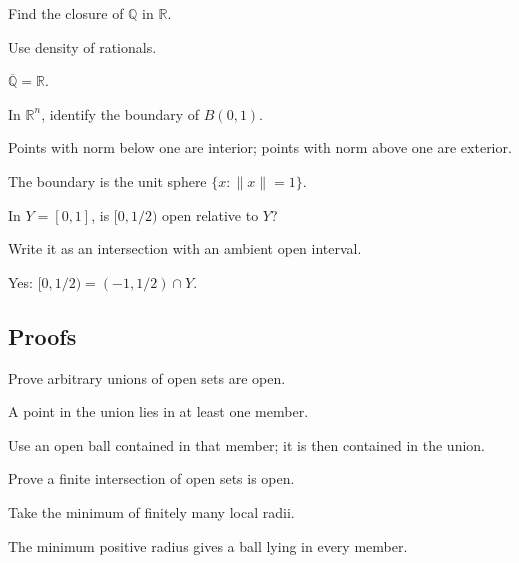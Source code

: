 \begin{exercise}\label{exr:ii04-expand-03}
Find the closure of \(\mathbb Q\) in \(\mathbb R\).
\end{exercise}
\begin{hint}
Use density of rationals.
\end{hint}
\begin{solution}
\(\overline{\mathbb Q}=\mathbb R\).
\end{solution}

\begin{exercise}\label{exr:ii04-expand-04}
In \(\mathbb R^n\), identify the boundary of \(B(0,1)\).
\end{exercise}
\begin{hint}
Points with norm below one are interior; points with norm above one are exterior.
\end{hint}
\begin{solution}
The boundary is the unit sphere \(\{x:\|x\|=1\}\).
\end{solution}

\begin{exercise}\label{exr:ii04-expand-05}
In \(Y=[0,1]\), is \([0,1/2)\) open relative to \(Y\)?
\end{exercise}
\begin{hint}
Write it as an intersection with an ambient open interval.
\end{hint}
\begin{solution}
Yes: \([0,1/2)=(-1,1/2)\cap Y\).
\end{solution}

\subsection*{Proofs}

\begin{exercise}\label{exr:ii04-expand-06}
Prove arbitrary unions of open sets are open.
\end{exercise}
\begin{hint}
A point in the union lies in at least one member.
\end{hint}
\begin{solution}
Use an open ball contained in that member; it is then contained in the union.
\end{solution}

\begin{exercise}\label{exr:ii04-expand-07}
Prove a finite intersection of open sets is open.
\end{exercise}
\begin{hint}
Take the minimum of finitely many local radii.
\end{hint}
\begin{solution}
The minimum positive radius gives a ball lying in every member.
\end{solution}

